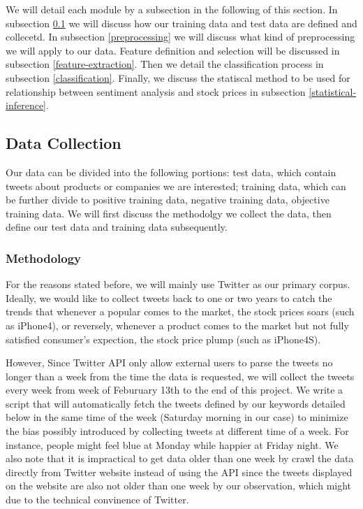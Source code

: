 \documentclass[12pt]{article}
\begin{document}
We will detail each module by a subsection in the following of this section. In subsection \ref{data-collection} we will discuss how our training data and test data are defined and collecetd. In subsection \ref{preprocessing} we will discuss what kind of preprocessing we will apply to our data. Feature definition and selection will be discussed in subsection \ref{feature-extraction}. Then we detail the classification process in subsection \ref{classification}. Finally, we discuss the statiscal method to be used for relationship between sentiment analysis and stock prices in subsection \ref{statistical-inference}.

\subsection{Data Collection}\label{data-collection}
Our data can be divided into the following portions: test data, which contain tweets about products or companies we are interested; training data, which can be further divide to positive training data, negative training data, objective training data. We will first discuss the methodolgy we collect the data, then define our test data and training data subsequently.

\subsubsection{Methodology}
For the reasons stated before, we will mainly use Twitter as our primary corpus. Ideally, we would like to collect tweets back to one or two years to catch the trends that whenever a popular comes to the market, the stock prices soars (such as iPhone4), or reversely, whenever a product comes to the market but not fully satisfied consumer's expection, the stock price plump (such as iPhone4S). 

However, Since Twitter API only allow external users to parse the tweets no longer than a week from the time the data is requested, we will collect the tweets every week from week of Feburuary 13th to the end of this project. We write a script that will automatically fetch the tweets defined by our keywords detailed below in the same time of the week (Saturday morning in our case) to minimize the bias possibly introduced by collecting tweets at different time of a week. For instance, people might feel blue at Monday while happier at Friday night. We also note that it is impractical to get data older than one week by crawl the data directly from Twitter website instead of using the API since the tweets displayed on the website are also not older than one week by our observation, which might due to the technical convinence of Twitter.
\end{document}
